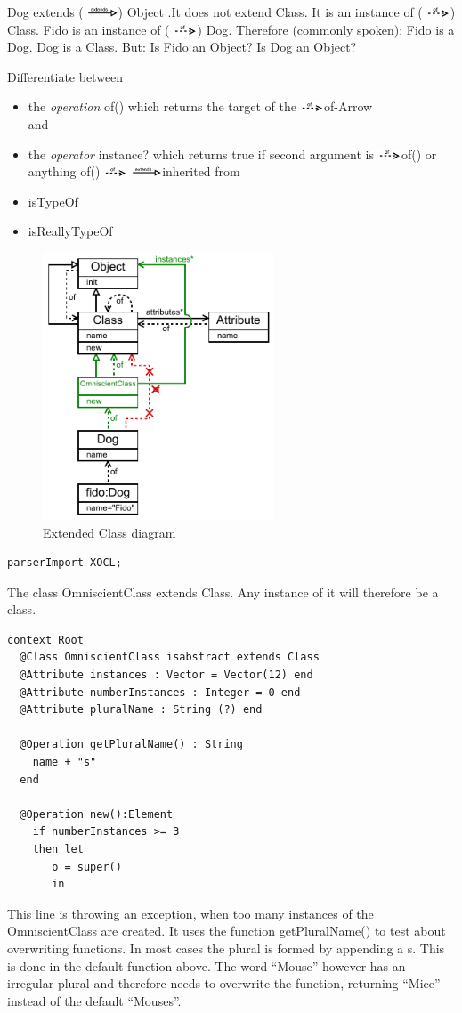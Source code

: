 \documentclass{scrreprt}
\newcommand{\of}{%
\includegraphics[height=8pt]{img/arrowOf.png}\hspace{1mm}}
\newcommand{\extends}{%
\includegraphics[height=8pt]{img/arrowExtends.png}\hspace{1mm}}
\begin{document}
Dog extends (\extends) {\ttfamily Object} .It does not extend {\ttfamily Class}. It is an instance of (\of) {\ttfamily Class}. {\ttfamily Fido} is an instance of (\of) {\ttfamily Dog}. Therefore (commonly spoken): Fido is a Dog. Dog is a Class. But: Is {\ttfamily Fido} an {\ttfamily Object}? Is {\ttfamily Dog} an {\ttfamily Object}?

Differentiate between 
\begin{itemize}
	\item the \textit{operation} of() which returns the target of the \of of-Arrow \\
and 
	\item the \textit{operator} instance? which returns true if second argument is \of of() or anything of() \of\extends inherited from
  \item isTypeOf
  \item isReallyTypeOf
\end{itemize}

\begin{figure}[ht!]
	\centering
	\includegraphics[width=195pt]{img/classDiagram2.pdf}
	\caption{Extended Class diagram}
	\label{fig:exampleDogClassDiagram2}
\end{figure} 

\begin{verbatim}
parserImport XOCL;

\end{verbatim}
The class {\ttfamily OmniscientClass} extends {\ttfamily Class}. Any instance of
it will therefore be a class.
\begin{verbatim}
context Root
  @Class OmniscientClass isabstract extends Class 
  @Attribute instances : Vector = Vector(12) end
  @Attribute numberInstances : Integer = 0 end
  @Attribute pluralName : String (?) end
  
  @Operation getPluralName() : String  
    name + "s"
  end
  
  @Operation new():Element
    if numberInstances >= 3 
    then let
       o = super()
       in
\end{verbatim}
This line is throwing an exception, when too many instances of the
OmniscientClass are created. It uses the function {\ttfamily getPluralName()} to
test about overwriting functions. In most cases the plural is formed by
appending a {\ttfamily s}. This is done in the default function above. The word ``Mouse''
however has an irregular plural and therefore needs to overwrite the function,
returning ``Mice'' instead of the default ``Mouses''.
\end{document}
